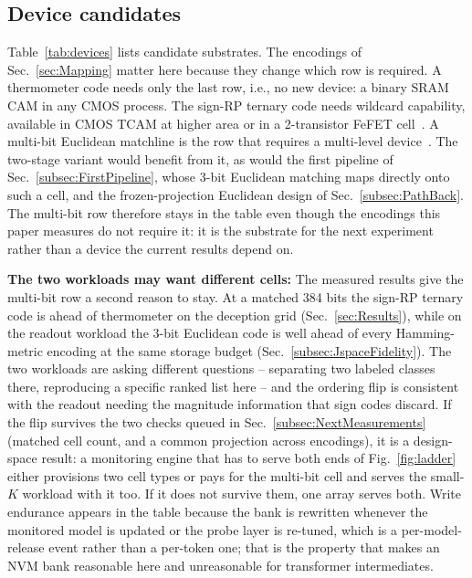 \documentclass[conference]{IEEEtran}
\newcommand{\cam}{{CAM}\xspace}
\newcommand{\tcam}{{TCAM}\xspace}
\newcommand{\fefet}{{FeFET}\xspace}
\newcommand{\signrp}{{sign-RP}\xspace}
\begin{document}
\subsection{Device candidates}
\label{subsec:Devices}
Table~\ref{tab:devices} lists candidate substrates. The encodings of
Sec.~\ref{sec:Mapping} matter here because they change which row is
required. A thermometer code needs only the last row, i.e., no new
device: a binary SRAM \cam in any CMOS process. The \signrp ternary code
needs wildcard capability, available in CMOS \tcam at higher area or in a
2-transistor \fefet cell~\cite{ni2019fetcam}. A multi-bit Euclidean
matchline is the row that requires a multi-level
device~\cite{kazemi2021fefetcam}. The two-stage variant would benefit
from it, as would the first pipeline of Sec.~\ref{subsec:FirstPipeline},
whose 3-bit Euclidean matching maps directly onto such a cell, and the
frozen-projection Euclidean design of Sec.~\ref{subsec:PathBack}. The
multi-bit row therefore stays in the table even though the encodings
this paper measures do not require it: it is the substrate for the next
experiment rather than a device the current results depend on.

\textbf{The two workloads may want different cells:} The measured
results give the multi-bit row a second reason to stay. At a matched
384 bits the \signrp ternary code is ahead of thermometer on the
deception grid (Sec.~\ref{sec:Results}), while on the readout workload
the 3-bit Euclidean code is well ahead of every Hamming-metric encoding
at the same storage budget (Sec.~\ref{subsec:JspaceFidelity}). The two
workloads are asking different questions -- separating two labeled
classes there, reproducing a specific ranked list here -- and the
ordering flip is consistent with the readout needing the magnitude
information that sign codes discard. If the flip survives the two
checks queued in Sec.~\ref{subsec:NextMeasurements} (matched cell
count, and a common projection across encodings), it is a design-space
result: a monitoring engine that has to serve both ends of
Fig.~\ref{fig:ladder} either provisions two cell types or pays for the
multi-bit cell and serves the small-$K$ workload with it too. If it
does not survive them, one array serves both. Write endurance appears in
the table because the bank is rewritten whenever the monitored model is
updated or the probe layer is re-tuned, which is a per-model-release
event rather than a per-token one; that is the property that makes an NVM
bank reasonable here and unreasonable for transformer intermediates.
\end{document}

